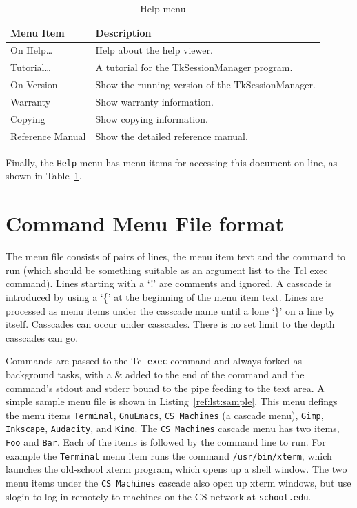 \begin{table}[hbpt]
\begin{centering}
\begin{tabular}{|l|p{3in}|}
\hline
Menu Item & Description \\
\hline
\hline
On Help\ldots & Help about the help viewer. \\
\hline
Tutorial\ldots & A tutorial for the TkSessionManager program.\\
\hline
On Version & Show the running version of the TkSessionManager.\\
\hline
Warranty & Show warranty information.\\
\hline
Copying & Show copying information.\\
\hline
Reference Manual & Show the detailed reference manual.\\
\hline
\end{tabular}
\caption{Help menu}
\label{ref:tab:helpmenu}
\end{centering}
\end{table}
Finally, the \texttt{Help} menu has menu items for accessing this
document on-line, as shown in Table~\ref{ref:tab:helpmenu}.

\section{Command Menu File format}
\label{sect:CommandMenuFile}

The menu file consists of pairs of lines, the menu item text and the
command to run (which should be something suitable as an argument list
to the Tcl exec command).  Lines starting with a `!' are comments and
ignored. A casscade is introduced by using a `\{' at the beginning of the
menu item text.  Lines are processed as menu items under the casscade
name until a lone `\}' on a line by itself.  Casscades can occur under
casscades.  There is no set limit to the depth casscades can go.

Commands are passed to the Tcl \texttt{exec} command and always forked
as background tasks, with a \& added to the end of the command and the
command's stdout and stderr bound to the pipe feeding to the text area.
A simple sample menu file is shown in Listing~\ref{ref:lst:sample}.
This menu defings the menu items \texttt{Terminal}, \texttt{GnuEmacs},
\texttt{CS Machines} (a cascade menu), \texttt{Gimp},
\texttt{Inkscape}, \texttt{Audacity}, and \texttt{Kino}.  The
\texttt{CS Machines} cascade menu has two items, \texttt{Foo} and
\texttt{Bar}. Each of the items is followed by the command line to run.
For example the \texttt{Terminal} menu item runs the command
\texttt{/usr/bin/xterm}, which launches the old-school xterm program,
which opens up a shell window.  The two menu items under the \texttt{CS
Machines} cascade also open up xterm windows, but use slogin to log in
remotely to machines on the CS network at \texttt{school.edu}.

